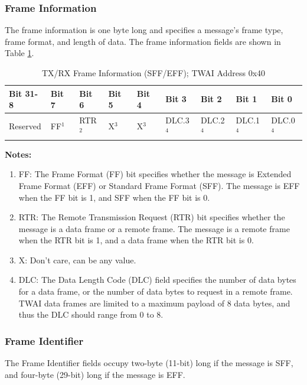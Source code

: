 \documentclass[main\_\_EN.tex]{subfiles}
\begin{document}
\subsubsection{Frame Information}
The frame information is one byte long and specifies a message's frame type, frame format, and length of data. The frame information fields are shown in Table \ref{tab:twai-tx-rx-frame-info-sff-eff}.

\begin{longtable}[c]{|p{1.4cm}|p{1.4cm}|p{1.4cm}|p{1.4cm}|p{1.4cm}|p{1.4cm}|p{1.4cm}|p{1.4cm}|p{1.4cm}|}
    \caption{TX/RX Frame Information (SFF/EFF); TWAI Address 0x40}
    \label{tab:twai-tx-rx-frame-info-sff-eff}\\
    \hline
       \rowcolor{lightgray}
    \textbf{Bit 31-8} & \textbf{Bit 7} & \textbf{Bit 6} & \textbf{Bit 5} & \textbf{Bit 4} & \textbf{Bit 3} & \textbf{Bit 2} & \textbf{Bit 1} & \textbf{Bit 0}\\\hline
    Reserved & FF$^1$ & RTR$^2$  & X$^3$  & X$^3$  & DLC.3$^4$ & DLC.2$^4$ & DLC.1$^4$ & DLC.0$^4$\\
    \hline
\end{longtable}
\vspace{-1.5em}
{\bfseries Notes:}\\
\begin{enumerate}
    \item FF: The Frame Format (FF) bit specifies whether the message is Extended Frame Format (EFF) or Standard Frame Format (SFF). The message is EFF when the FF bit is 1, and SFF when the FF bit is 0.
    \item RTR: The Remote Transmission Request (RTR) bit specifies whether the message is a data frame or a remote frame. The message is a remote frame when the RTR bit is 1, and a data frame when the RTR bit is 0.
    \item X: Don't care, can be any value.
    \item DLC: The Data Length Code (DLC) field specifies the number of data bytes for a data frame, or the number of data bytes to request in a remote frame. TWAI data frames are limited to a maximum payload of 8 data bytes, and thus the DLC should range from 0 to 8.
\end{enumerate}


\subsubsection{Frame Identifier}
The Frame Identifier fields occupy two-byte (11-bit) long if the message is SFF, and four-byte (29-bit) long if the message is EFF.
\end{document}
